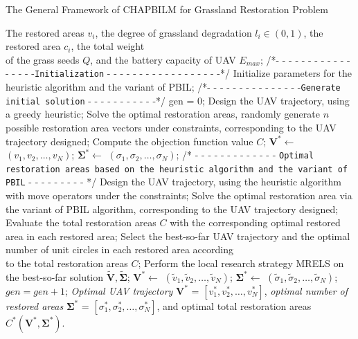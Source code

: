 \documentclass[preprint,5pt]{elsarticle}
\begin{document}
\begin{algorithm}[h]
\begin{algorithmic}[1]
 \caption{The General Framework of CHAPBILM for Grassland Restoration Problem} \label{LS-PBIL Algorithm}
        \REQUIRE The restored areas $v_i$, the degree of grassland degradation $l_i \in (0,1)$, the restored area $c_i$, the total weight \\ of the grass seeds $Q$, and the battery capacity of UAV $E_{max}$;
        \STATE /*- - - - - - - - - - - - - - - - -\texttt{Initialization} - - - - - - - - - - - - - - - - - -*/
        \STATE Initialize parameters for the heuristic algorithm and the variant of PBIL;
        \STATE /*- - - - - - - - - - - - - - -\texttt{Generate initial solution} -  - - - -  - - - - - -*/
        \STATE gen = 0;
        \STATE Design the UAV trajectory, using a greedy heuristic;
        \STATE Solve the optimal restoration areas, randomly generate $n$ possible restoration area vectors under constraints, corresponding to the UAV trajectory designed;
        \STATE Compute the objection function value $C$;
        \STATE $\mathbf{V^*}\leftarrow$  $(v_1,v_2,\ldots, v_N)$;
        \STATE $\mathbf{\Sigma^*}\leftarrow$  $(\sigma_1,\sigma_2,\ldots, \sigma_N)$;
        \STATE /* - - - - - - - - - - - - - \texttt{Optimal restoration areas based on the heuristic algorithm and the
variant of PBIL} - - - - - - - - - */
         \STATE Design the UAV trajectory, using the heuristic algorithm with move operators under the constraints;
         \STATE Solve the optimal restoration area via the variant of PBIL algorithm, corresponding to the UAV trajectory designed;
         \STATE Evaluate the total restoration areas $C$ with the corresponding optimal restored area in each restored area;
         \STATE Select the best-so-far UAV trajectory and the optimal number of unit circles in each restored area according \\ to the total restoration areas $C$;
         \STATE Perform the local research strategy MRELS on the best-so-far solution $\mathbf{\tilde{V}}, \mathbf{\tilde{\Sigma}}$;
         \STATE $\mathbf{V^*}\leftarrow$  $(\tilde{v}_1,\tilde{v}_2,\ldots, \tilde{v}_N)$;
         \STATE $\mathbf{\Sigma^*}\leftarrow$  $(\tilde{\sigma}_1,\tilde{\sigma}_2,\ldots, \tilde{\sigma}_N)$;
         \STATE $gen = gen + 1$;
         \ENDWHILE
         \ENSURE \emph{Optimal  UAV trajectory} $\mathbf{V}^*$ = $[v^*_1,v^*_2,\ldots,v^*_N]$, \emph{optimal number of restored areas} $\mathbf{\Sigma}^*$ = $[\sigma^*_1,\sigma^*_2,\ldots,\sigma^*_N]$, and optimal total restoration areas $C^*(\mathbf{V^*}, \mathbf{\Sigma^*})$.
   \end{algorithmic}
\end{algorithm}
\end{document}
